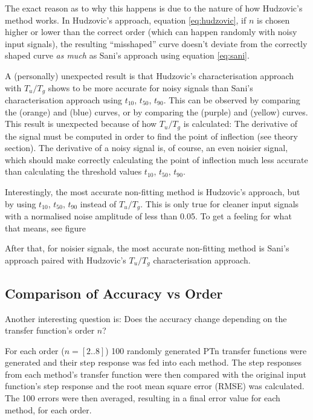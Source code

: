 The exact reason as to why this happens is due  to  the nature of how Hudzovic's
method works. In Hudzovic's  approach,  equation  \ref{eq:hudzovic},  if  $n$ is
chosen higher or lower  than  the  correct order (which can happen randomly with
noisy input signals), the resulting ``misshaped'' curve doesn't deviate from the
correctly  shaped curve \textit{as  much}  as  Sani's  approach  using  equation
\ref{eq:sani}.  

A (personally) unexpected  result  is  that Hudzovic's characterisation approach
with  $T_u/T_g$  shows  to  be  more  accurate for  noisy  signals  than  Sani's
characterisation  approach  using $t_{10}$,  $t_{50}$,  $t_{90}$.  This  can  be
observed  by comparing the (orange) and  (blue)  curves,  or  by  comparing  the
(purple) and (yellow) curves. This result is unexpected because of how $T_u/T_g$
is calculated: The derivative of  the  signal  must be computed in order to find
the point of inflection (see theory section). The  derivative  of a noisy signal
is, of course, an even noisier signal, 
which should make correctly  calculating  the  point  of  inflection  much  less
accurate  than calculating the threshold values  $t_{10}$,  $t_{50}$,  $t_{90}$.

Interestingly, the  most accurate non-fitting method is Hudzovic's approach, but
by using $t_{10}$, $t_{50}$, $t_{90}$ instead of  $T_u/T_g$.  This  is only true
for cleaner input signals with a normalised noise amplitude of less  than  0.05.
To get a feeling  for  what that means, see figure 

After that, for noisier signals,  the most accurate non-fitting method is Sani's
approach   paired   with   Hudzovic's   $T_u/T_g$   characterisation   approach.


\subsection{Comparison of Accuracy vs Order}

Another  interesting  question  is:  Does  the accuracy change depending on  the
transfer function's order $n$?

For each order ($n=[2..8]$) 100 randomly generated  PTn  transfer functions were
generated and their step response was fed into each  method.  The step responses
from each method's transfer function were then  compared with the original input
function's step response and the root mean square error (RMSE)  was  calculated.
The  100  errors  were then averaged, resulting in a final error value for  each
method, for each order.

